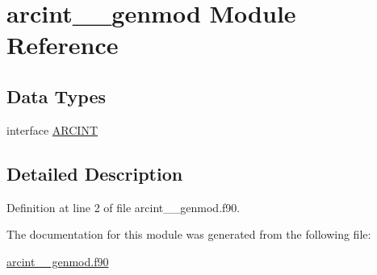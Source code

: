 \hypertarget{classarcint____genmod}{\section{arcint\+\_\+\+\_\+genmod Module Reference}
\label{classarcint____genmod}
}
\subsection*{Data Types}
\begin{DoxyCompactItemize}
\item 
interface \hyperlink{interfacearcint____genmod_1_1ARCINT}{A\+R\+C\+I\+N\+T}
\end{DoxyCompactItemize}


\subsection{Detailed Description}


Definition at line 2 of file arcint\+\_\+\+\_\+genmod.\+f90.



The documentation for this module was generated from the following file\+:\begin{DoxyCompactItemize}
\item 
\hyperlink{arcint____genmod_8f90}{arcint\+\_\+\+\_\+genmod.\+f90}\end{DoxyCompactItemize}
